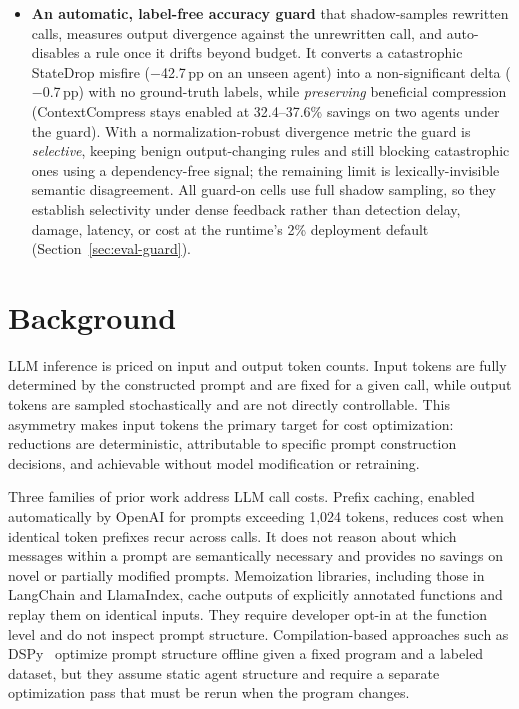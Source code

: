 \begin{itemize}
\item \textbf{An automatic, label-free accuracy guard} that shadow-samples rewritten
calls, measures output divergence against the unrewritten call, and auto-disables a
rule once it drifts beyond budget. It converts a catastrophic StateDrop misfire
($-$42.7\,pp on an unseen agent) into a non-significant delta ($-$0.7\,pp) with no
ground-truth labels, while \textit{preserving} beneficial compression (ContextCompress
stays enabled at 32.4--37.6\% savings on two agents under the guard). With a
normalization-robust divergence metric the guard is \textit{selective}, keeping benign
output-changing rules and still blocking catastrophic ones using a dependency-free signal;
the remaining limit is lexically-invisible semantic disagreement. All guard-on cells use
full shadow sampling, so they establish selectivity under dense feedback rather than
detection delay, damage, latency, or cost at the runtime's 2\% deployment default
(Section~\ref{sec:eval-guard}).
\end{itemize}

\section{Background}
\label{sec:background}

LLM inference is priced on input and output token counts. Input tokens are fully
determined by the constructed prompt and are fixed for a given call, while output
tokens are sampled stochastically and are not directly controllable. This asymmetry
makes input tokens the primary target for cost optimization: reductions are
deterministic, attributable to specific prompt construction decisions, and achievable
without model modification or retraining.

Three families of prior work address LLM call costs. Prefix caching, enabled
automatically by OpenAI for prompts exceeding 1,024 tokens, reduces cost when
identical token prefixes recur across calls. It does not reason about which messages
within a prompt are semantically necessary and provides no savings on novel or
partially modified prompts. Memoization libraries, including those in LangChain and
LlamaIndex, cache outputs of explicitly annotated functions and replay them on
identical inputs. They require developer opt-in at the function level and do not
inspect prompt structure. Compilation-based approaches such as
DSPy~\cite{khattab2024dspy} optimize prompt structure offline given a fixed program
and a labeled dataset, but they assume static agent structure and require a separate
optimization pass that must be rerun when the program changes.

